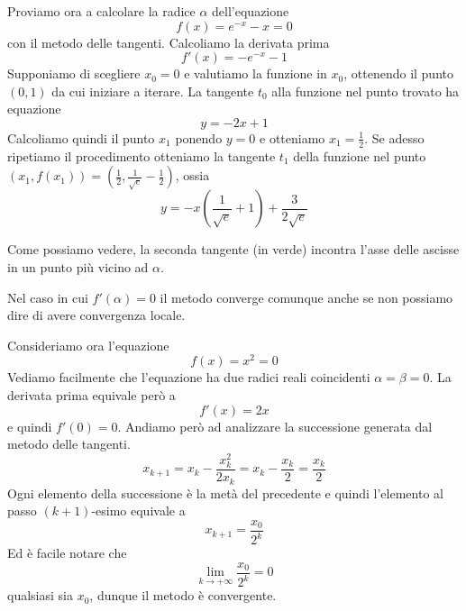 \begin{example}
	Proviamo ora a calcolare la radice $\alpha$ dell'equazione
	\[ f(x) = e^{-x} - x = 0 \]
	con il metodo delle tangenti. Calcoliamo la derivata prima
	\[ f'(x) = -e^{-x} - 1 \]
	Supponiamo di scegliere $x_0 = 0$ e valutiamo la funzione in $x_0$, ottenendo il punto $(0, 1)$
	da cui iniziare a iterare. La tangente $t_0$ alla funzione nel punto trovato ha equazione
	\[ y = -2x + 1 \]
	Calcoliamo quindi il punto $x_1$ ponendo $y=0$ e otteniamo $x_1 = \frac{1}{2}$.
	Se adesso ripetiamo il procedimento otteniamo la tangente $t_1$ della funzione nel punto
	$(x_1, f(x_1)) = \left( \frac{1}{2}, \frac{1}{\sqrt{e}} - \frac{1}{2} \right)$, ossia
	\[ y = - x \left( \frac{1}{\sqrt{e}} + 1 \right) + \frac{3}{2 \sqrt{e}} \]
	\begin{center}
	\end{center}
	Come possiamo vedere, la seconda tangente (in verde) incontra l'asse delle ascisse in un punto più vicino ad
	$\alpha$.
\end{example}

Nel caso in cui $f'(\alpha) = 0$ il metodo converge comunque anche se non possiamo dire di avere convergenza
locale.

\begin{example}
	Consideriamo ora l'equazione
	\[ f(x) = x^2 = 0 \]
	Vediamo facilmente che l'equazione ha due radici reali coincidenti $\alpha = \beta = 0$. La derivata prima
	equivale però a
	\[ f'(x) = 2x \]
	e quindi $f'(0) = 0$. Andiamo però ad analizzare la successione generata dal metodo delle tangenti.
	\[ x_{k+1} = x_k - \frac{x_k^2}{2 x_k} = x_k - \frac{x_k}{2} = \frac{x_k}{2} \]
	Ogni elemento della successione è la metà del precedente e quindi l'elemento al passo $(k+1)$-esimo equivale a
	\[ x_{k+1} = \frac{x_0}{2^k} \]
	Ed è facile notare che
	\[ \lim_{k \to +\infty} \frac{x_0}{2^k} = 0 \]
	qualsiasi sia $x_0$, dunque il metodo è convergente.
\end{example}


